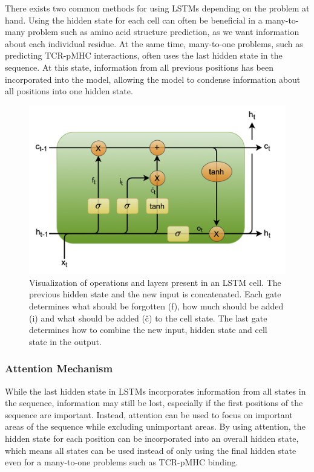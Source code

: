 There exists two common methods for using LSTMs depending on the problem at hand. Using the hidden state for each cell can often be beneficial in a many-to-many problem such as amino acid structure prediction, as we want information about each individual residue. At the same time, many-to-one problems, such as predicting TCR-pMHC interactions, often uses the last hidden state in the sequence. At this state, information from all previous positions has been incorporated into the model, allowing the model to condense information about all positions into one hidden state.

\begin{figure}
    \centering
    \includegraphics[width=0.9\linewidth]{figures/lstm.png}
    \caption{Visualization of operations and layers present in an LSTM cell. The previous hidden state and the new input is concatenated. Each gate determines what should be forgotten (f), how much should be added (i) and what should be added (\v{c}) to the cell state. The last gate determines how to combine the new input, hidden state and cell state in the output.}
    \label{fig:lstm}
\end{figure}

\subsubsection{Attention Mechanism} \label{section:attention}
While the last hidden state in LSTMs incorporates information from all states in the sequence, information may still be lost, especially if the first positions of the sequence are important. Instead, attention can be used to focus on important areas of the sequence while excluding unimportant areas. By using attention, the hidden state for each position can be incorporated into an overall hidden state, which means all states can be used instead of only using the final hidden state even for a many-to-one problems such as TCR-pMHC binding.

